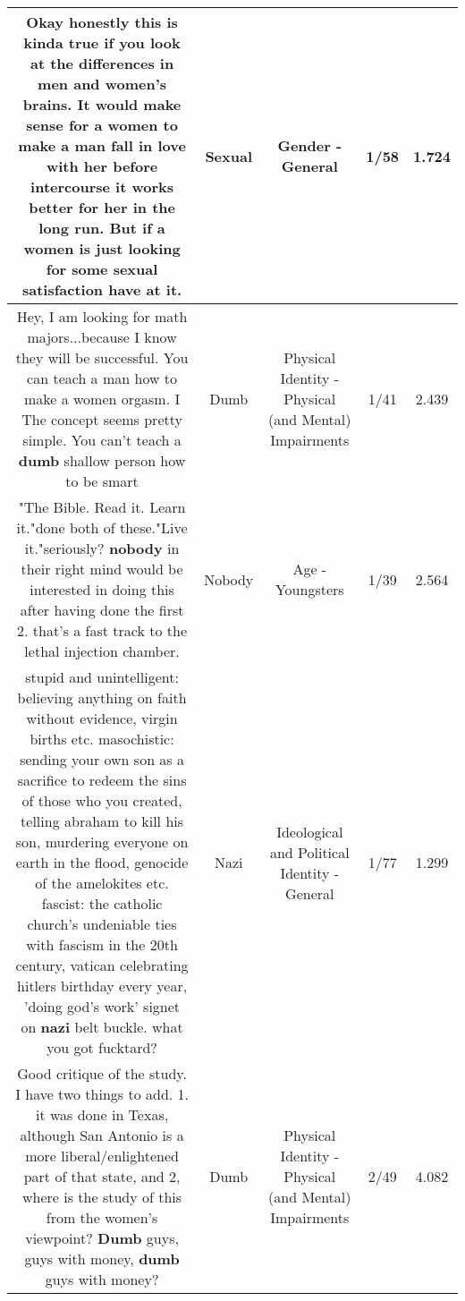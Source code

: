 \documentclass[11pt]{article}
\newlength\mylength
\begin{document}
\begin{center}
\begin{longtable}{|C{.65\mylength}|C{.30\mylength}|C{.12\mylength}|C{.12\mylength}|C{.12\mylength}|}
  \small Okay honestly this is kinda true if you look at the differences in men and women's brains. It would make sense for a women to make a man fall in love with her before intercourse it works better for her in the long run. But if a women is just looking for some \textbf{sexual} satisfaction have at it.\normalsize   & Sexual & Gender - General & 1/58 & 1.724 \\  \hline
  \small Hey, I am looking for math majors...because I know they will be successful. You can teach a man how to make a women orgasm. I The concept seems pretty simple. You can't teach a \textbf{dumb} shallow person how to be smart\normalsize   & Dumb & Physical Identity - Physical (and Mental) Impairments & 1/41 & 2.439 \\  \hline
  \small "The Bible. Read it. Learn it."done both of these."Live it."seriously? \textbf{nobody} in their right mind would be interested in doing this after having done the first 2. that's a fast track to the lethal injection chamber.\normalsize   & Nobody & Age - Youngsters & 1/39 & 2.564 \\  \hline
  \small stupid and unintelligent: believing anything on faith without evidence, virgin births etc. masochistic: sending your own son as a sacrifice to redeem the sins of those who you created, telling abraham to kill his son, murdering everyone on earth in the flood, genocide of the amelokites etc. fascist: the catholic church's undeniable ties with fascism in the 20th century, vatican celebrating hitlers birthday every year, 'doing god's work' signet on \textbf{nazi} belt buckle. what you got fucktard?\normalsize   & Nazi &  Ideological and Political Identity - General & 1/77 & 1.299 \\  \hline
  \small Good critique of the study. I have two things to add. 1. it was done in Texas, although San Antonio is a more liberal/enlightened part of that state, and 2, where is the study of this from the women's viewpoint? \textbf{Dumb} guys, guys with money, \textbf{dumb} guys with money?\normalsize   & Dumb & Physical Identity - Physical (and Mental) Impairments & 2/49 & 4.082 \\  \hline

\end{longtable}
\end{center}
\end{document}
